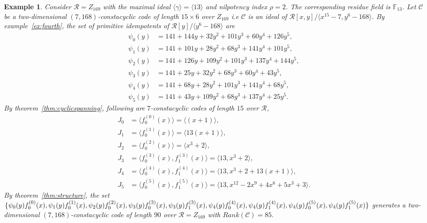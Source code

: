 \documentclass[12pt,a4paper]{article}
\newtheorem{example}{Example}
\begin{document}
\begin{example}\label{ex:sixth}
    Consider $\mathcal{R}=Z_{169}$ with the maximal ideal $\langle\gamma\rangle=\langle13\rangle$ and nilpotency index $\rho=2$. The corresponding residue field is $\mathbb{F}_{13}$. Let $\mathscr{C}$ be a two-dimensional $(7,168)$-constacyclic code of length $15 \times 6$ over $Z_{169}$ i.e $\mathscr{C}$ is an ideal of $\mathcal{R}[x,y]/\langle x^{15}-7, y^6-168 \rangle$. By example~\ref{ex:fourth}, the set of primitive idempotents of $\mathcal{R}[y]/\langle y^6-168 \rangle$ are
    \[
    \begin{aligned}
    \psi_0(y)&= 141+144y+32y^2+101y^3+60y^4+126y^5,\\
    \psi_1(y)&= 141+101y+28y^2+68y^3+141y^4+101y^5,\\
    \psi_2(y)&= 141+126y+109y^2+101y^3+137y^4+144y^5,\\
    \psi_3(y)&= 141+25y+32y^2+68y^3+60y^4+43y^5,\\
    \psi_4(y)&= 141+68y+28y^2+101y^3+141y^4+68y^5,\\
    \psi_5(y)&= 141+43y+109y^2+68y^3+137y^4+25y^5.
    \end{aligned}
    \]
    By theorem~\ref{thm:cyclicspanning}, following are $7$-constacyclic codes of length $15$ over $\mathcal{R}$,
    \[
    \begin{aligned}
    J_0 &= \langle f^{(0)}_0(x) \rangle = \langle (x+1) \rangle, \\
    J_1 &= \langle f^{(1)}_0(x) \rangle = \langle 13(x+1) \rangle, \\
    J_2 &= \langle f^{(2)}_0(x) \rangle = \langle x^3+2\rangle, \\
    J_3 &= \langle f^{(3)}_0(x), f^{(3)}_1(x) \rangle 
    = \langle 13,x^3+2 \rangle, \\
    J_4 &= \langle f^{(4)}_0(x), f^{(4)}_1(x) \rangle 
    = \langle 13,x^3+2+13(x+1) \rangle, \\
    J_5 &= \langle f^{(5)}_0(x), f^{(5)}_1(x) \rangle 
    = \langle 13,x^{12}-2x^9+4x^6+5x^3+3 \rangle.
    \end{aligned}
    \]
    By theorem~\ref{thm:structure}, the set $\{ \psi_0(y)f^{(0)}_0(x),\psi_1(y)f^{(1)}_0(x),\psi_2(y)f^{(2)}_0(x), \psi_3(y)f^{(3)}_0(x),\psi_3(y)f^{(3)}_1(x),\\ \psi_4(y)f^{(4)}_0(x),\psi_4(y)f^{(4)}_1(x),\psi_4(y)f^{(5)}_0(x),\psi_4(y)f^{(5)}_1(x)\}$ generates a two-dimensional $(7,168)$-constacyclic code of length $90$ over $\mathcal{R}=Z_{169}$ with $Rank(\mathcal{C})=85$.
\end{example}
\end{document}
